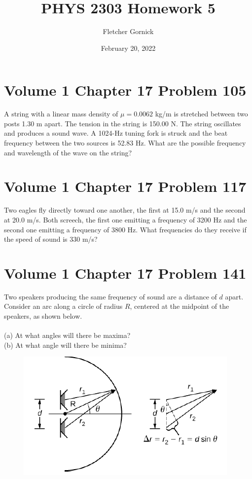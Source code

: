 \documentclass[11pt]{article}
\title{\vspace{-1.0cm}PHYS 2303 Homework 5}
\author{Fletcher Gornick}
\date{February 20, 2022}
\begin{document}
 \maketitle
 \section*{Volume 1 Chapter 17 Problem 105}
  A string with a linear mass density of \(\mu = 0.0062\) kg/m is stretched between two 
  posts 1.30 m apart. The tension in the string is 150.00 N. The string oscillates and 
  produces a sound wave. A 1024-Hz tuning fork is struck and the beat frequency between 
  the two sources is 52.83 Hz. What are the possible frequency and wavelength of the 
  wave on the string?
 \newpage

 \section*{Volume 1 Chapter 17 Problem 117}
  Two eagles fly directly toward one another, the first at 15.0 m/s and the second at 
  20.0 m/s. Both screech, the first one emitting a frequency of 3200 Hz and the second 
  one emitting a frequency of 3800 Hz. What frequencies do they receive if the speed of 
  sound is 330 m/s?
 \newpage

 \section*{Volume 1 Chapter 17 Problem 141}
  Two speakers producing the same frequency of sound are a distance of \(d\) apart. 
  Consider an arc along a circle of radius \(R\), centered at the midpoint of the 
  speakers, as shown below. \\\\
  (a) At what angles will there be maxima? \\
  (b) At what angle will there be minima?
  \begin{figure}
   \includegraphics[scale=0.5]{1-17-141.png}
  \end{figure}
 \newpage
\end{document}
